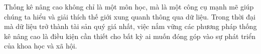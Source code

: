 Thống kê nâng cao không chỉ là một môn học, mà là một công cụ mạnh mẽ giúp chúng ta hiểu và giải thích thế giới xung quanh thông qua dữ liệu. Trong thời đại mà dữ liệu trở thành tài sản quý giá nhất, việc nắm vững các phương pháp thống kê nâng cao là điều kiện cần thiết cho bất kỳ ai muốn đóng góp vào sự phát triển của khoa học và xã hội.